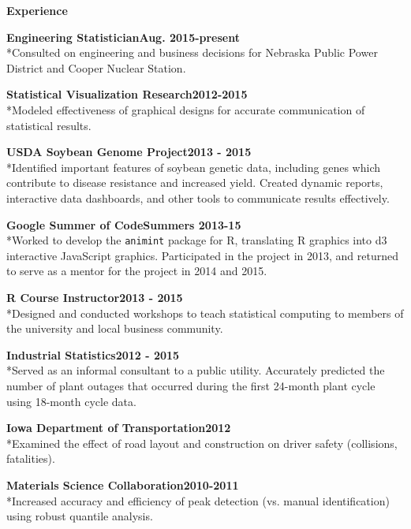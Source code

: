 \documentclass[letterpaper,12pt,final]{memoir}
\newcommand{\MedSep}{\vspace{1em}}
\newcommand{\SmallSep}{\vspace{0.5em}}
\newcommand{\CVSection}[1]
	{\Large\textbf{#1}\par
	\SmallSep\normalsize\normalfont}
\newcommand{\CVItem}[1]
	{\textbf{\color{RoyalBlue} #1}}
\newcommand{\Experience}[3]{\parbox{\linewidth}{\CVItem{#1\hfill#2}\\*{\small #3\MedSep}}}
\begin{document}
\CVSection{Experience}
\begin{multicols}{2}

\Experience{Engineering Statistician}
{Aug. 2015-present}
{Consulted on engineering and business decisions for Nebraska Public Power District and Cooper Nuclear Station.}

\Experience{Statistical Visualization Research}
{2012-2015}
{Modeled effectiveness of graphical designs for accurate communication of statistical results.}

\Experience{USDA Soybean Genome Project}
{2013 - 2015}
{Identified important features of soybean genetic data, including genes which contribute to disease resistance and increased yield. Created dynamic reports, interactive data dashboards, and other tools to communicate results effectively.}

\Experience{Google Summer of Code}
{Summers 2013-15}
{Worked to develop the \texttt{animint} package for R, translating R graphics into d3 interactive JavaScript graphics. Participated in the project in 2013, and returned to serve as a mentor for the project in 2014 and 2015.}

\Experience{R Course Instructor}
{2013 - 2015}
{Designed and conducted workshops to teach statistical computing to members of the university and local business community.}


\Experience{Industrial Statistics}
{2012 - 2015}
{Served as an informal consultant to a public utility. Accurately predicted the number of plant outages that occurred during the first 24-month plant cycle using 18-month cycle data. }

\Experience{Iowa Department of Transportation}
{2012}
{Examined the effect of road layout and construction on driver safety (collisions, fatalities).}

\Experience{Materials Science Collaboration}
{2010-2011}
{Increased accuracy and efficiency of peak detection (vs. manual identification) using robust quantile analysis. }
\end{multicols}
\end{document}
